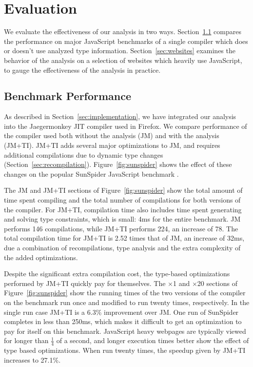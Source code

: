 
\section{Evaluation}

We evaluate the effectiveness of our analysis in two ways.
Section~\ref{sec:benchmarks} compares the performance on major JavaScript benchmarks
of a single compiler which does or doesn't use analyzed type information.
Section~\ref{sec:websites} examines the behavior of the analysis on a selection of
websites which heavily use JavaScript, to gauge the effectiveness of the
analysis in practice.

\subsection{Benchmark Performance}
\label{sec:benchmarks}

As described in Section~\ref{sec:implementation}, we have integrated our analysis into
the Jaegermonkey JIT compiler used in Firefox.
We compare performance of the compiler used both without the analysis (JM)
and with the analysis (JM+TI).
JM+TI adds several major optimizations to JM,
and requires additional compilations due to dynamic type changes
(Section~\ref{sec:recompilation}).
Figure~\ref{fig:sunspider} shows the effect of these changes on the popular
SunSpider JavaScript benchmark \cite{XXX}.

The JM and JM+TI sections of Figure~\ref{fig:sunspider} show the total amount of time
spent compiling and the total number of compilations for both versions of
the compiler.
For JM+TI, compilation time also includes time spent generating and solving
type constraints, which is small: 4ms for the entire benchmark.
JM performs 146 compilations, while JM+TI performs 224, an increase of 78.
The total compilation time for JM+TI is 2.52 times that of JM, an increase
of 32ms, due a combination of recompilations, type analysis and the extra
complexity of the added optimizations.

Despite the significant extra compilation cost, the type-based optimizations
performed by JM+TI quickly pay for themselves. The $\times$1 and
$\times$20 sections
of Figure~\ref{fig:sunspider} show the running times of the two versions of the
compiler on the benchmark run once and modified to run twenty times,
respectively.
In the single run case JM+TI is a 6.3\% improvement over JM.
One run of SunSpider completes in less than 250ms, which makes it
difficult to get an optimization to pay for itself on this benchmark.
JavaScript heavy webpages are typically viewed for longer than
$\frac{1}{4}$ of a second, and longer execution times better show the effect
of type based optimizations.
When run twenty times, the speedup given by JM+TI increases to 27.1\%.

